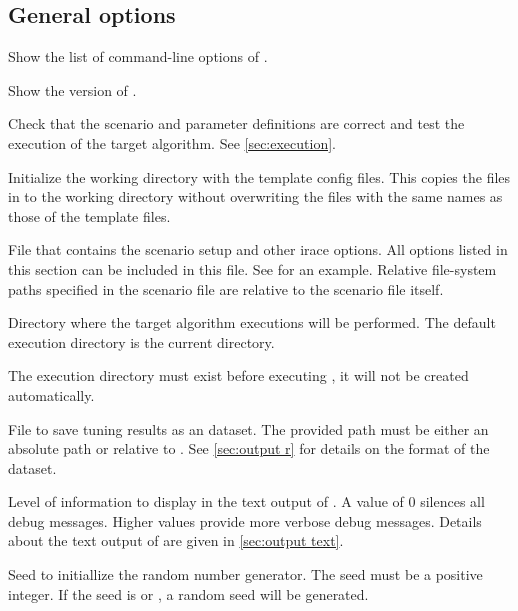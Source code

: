


\subsection[General options]{General options}
\begin{description}
Show the list of command-line options of \irace.

Show the version of \irace.

Check that the scenario and parameter definitions are correct and test the execution of the target algorithm. See \autoref{sec:execution}.

Initialize the working directory with the template config files. This copies the files in  to the working directory without overwriting the files with the same names as those of the template files.

File that contains the scenario setup and other irace options. All options listed in this section can be included in this file. See  for an example. Relative file-system paths specified in the scenario file are relative to the scenario file itself.

Directory where the target algorithm executions will be performed. The default execution directory is the current directory.
 \begin{xwarningbox}
 The execution directory must exist before executing \irace, it will not be created automatically.
\end{xwarningbox}

  File to save tuning results as an \aR dataset. The provided path must be either an absolute path or relative to . See \autoref{sec:output r} for details on the format of the \aR dataset.

Level of information to display in the text output of \irace. A value of 0 silences all debug messages. Higher values provide more verbose debug messages. Details about the text output of \irace are given in \autoref{sec:output text}.

Seed to initiallize the random number generator. The seed must be a positive integer. If the seed is  or , a random seed will be generated.


\end{description}
